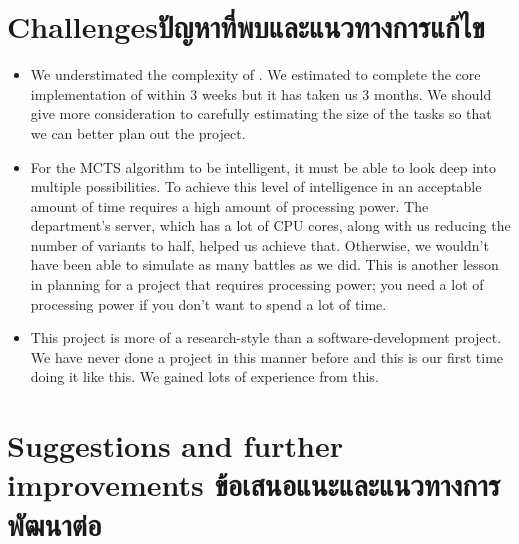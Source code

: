 \section{\ifenglish Challenges\else ปัญหาที่พบและแนวทางการแก้ไข\fi}

\begin{itemize}
    \item We understimated the complexity of \RootB{}. We estimated to complete the core implementation of \RootOurs{} within 3 weeks but it has taken us 3 months. We should give more consideration to carefully estimating the size of the tasks so that we can better plan out the project.
    \item For the MCTS algorithm to be intelligent, it must be able to look deep into multiple possibilities. To achieve this level of intelligence in an acceptable amount of time requires a high amount of processing power. The department's server, which has a lot of CPU cores, along with us reducing the number of variants to half, helped us achieve that. Otherwise, we wouldn't have been able to simulate as many battles as we did. This is another lesson in planning for a project that requires processing power; you need a lot of processing power if you don't want to spend a lot of time.
    \item This project is more of a research-style than a software-development project. We have never done a project in this manner before and this is our first time doing it like this. We gained lots of experience from this.
\end{itemize}

\section{\ifenglish%
Suggestions and further improvements
\else%
ข้อเสนอแนะและแนวทางการพัฒนาต่อ
\fi
}

